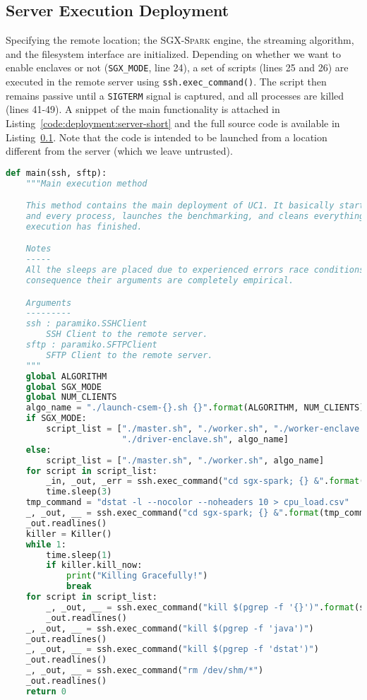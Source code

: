 \subsection{Server Execution Deployment} \label{sec:deployment:server}

Specifying the remote location; the \textsc{SGX-Spark} engine, the streaming algorithm, and the filesystem interface are initialized. 
Depending on whether we want to enable enclaves or not (\texttt{SGX\_MODE}, line 24), a set of scripts (lines 25 and 26) are executed in the remote server using \texttt{ssh.exec\_command()}.
The script then remains passive until a \texttt{SIGTERM} signal is captured, and all processes are killed (lines 41-49).
A snippet of the main functionality is attached in Listing~\ref{code:deployment:server-short} and the full source code is available in Listing~\ref{sec:deployment:server}.
Note that the code is intended to be launched from a location different from the server (which we leave untrusted).

\begin{lstlisting}[language=Python,caption={Main method of the Server-Side Deployment Script.},label=code:deployment:server-short]
def main(ssh, sftp):
    """Main execution method

    This method contains the main deployment of UC1. It basically starts each
    and every process, launches the benchmarking, and cleans everything when
    execution has finished.

    Notes
    -----
    All the sleeps are placed due to experienced errors race conditions. As a
    consequence their arguments are completely empirical.

    Arguments
    ---------
    ssh : paramiko.SSHClient
        SSH Client to the remote server.
    sftp : paramiko.SFTPClient
        SFTP Client to the remote server.
    """
    global ALGORITHM
    global SGX_MODE
    global NUM_CLIENTS
    algo_name = "./launch-csem-{}.sh {}".format(ALGORITHM, NUM_CLIENTS)
    if SGX_MODE:
        script_list = ["./master.sh", "./worker.sh", "./worker-enclave.sh",
                       "./driver-enclave.sh", algo_name]
    else:
        script_list = ["./master.sh", "./worker.sh", algo_name]
    for script in script_list:
        _in, _out, _err = ssh.exec_command("cd sgx-spark; {} &".format(script))
        time.sleep(3)
    tmp_command = "dstat -l --nocolor --noheaders 10 > cpu_load.csv"
    _, _out, __ = ssh.exec_command("cd sgx-spark; {} &".format(tmp_command))
    _out.readlines()
    killer = Killer()
    while 1:
        time.sleep(1)
        if killer.kill_now:
            print("Killing Gracefully!")
            break
    for script in script_list:
        _, _out, __ = ssh.exec_command("kill $(pgrep -f '{}')".format(script))
        _out.readlines()
    _, _out, __ = ssh.exec_command("kill $(pgrep -f 'java')")
    _out.readlines()
    _, _out, __ = ssh.exec_command("kill $(pgrep -f 'dstat')")
    _out.readlines()
    _, _out, __ = ssh.exec_command("rm /dev/shm/*")
    _out.readlines()
    return 0
\end{lstlisting}

